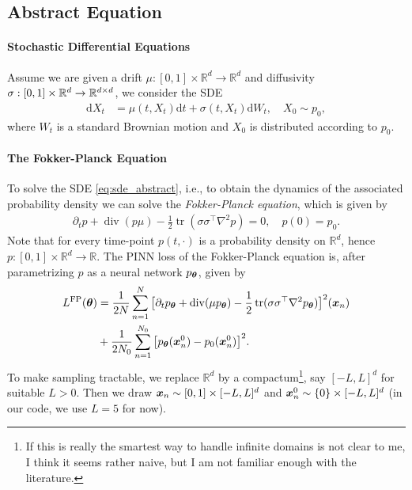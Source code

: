 \subsection{Abstract Equation}
\paragraph{Stochastic Differential Equations}
Assume we are given a drift $\mu:[0,1]\times \mathbb R^d\to\mathbb R^d$ and diffusivity $\sigma:[0,1] \times {\mathbb{R}}^d \to \mathbb R^{d\times d}$, we consider the SDE
\begin{align}\label{eq:sde_abstract}
  \mathrm dX_t
  &=
    \mu(t, X_t)\mathrm d t
    +
    \sigma(t, X_t) \mathrm d W_t,
    \quad
    X_0 \sim p_0,
\end{align}
where $W_t$ is a standard Brownian motion and $X_0$ is distributed according to $p_0$.

\paragraph{The Fokker-Planck Equation}
To solve the SDE \eqref{eq:sde_abstract}, i.e., to obtain the dynamics of the associated probability density we can solve the \emph{Fokker-Planck equation}, which is given by
\begin{align}\label{eq:fokker_planck_abstract}
  \partial_t p
  +
  \operatorname{div}(p\mu)
  -
  \frac12 \operatorname{tr}(\sigma \sigma^\top\nabla^2 p)
  =
  0,
  \quad
  p(0) = p_0.
\end{align}
Note that for every time-point $p(t,\cdot)$ is a probability density on $\mathbb R^d$, hence $p:[0,1]\times\mathbb R^d \to \mathbb R$. The PINN loss of the Fokker-Planck equation is, after parametrizing $p$ as a neural network $p_{{\bm{\theta}}}$, given by
\begin{align*}
  L^{\textrm{FP}}({\bm{\theta}})
  &=
    \frac{1}{2N}
    \sum_{n=1}^{N}
    \big[
    \partial_t p_{{\bm{\theta}}}
    +
    \operatorname{div}(\mu p_{{\bm{\theta}}})
    -
    \frac12 \operatorname{tr}(\sigma\sigma^\top\nabla^2 p_{{\bm{\theta}}})
    \big]^2
    ({\bm{x}}_n)
  \\
  &+
    \frac{1}{2 N_0}
    \sum_{n=1}^{N_0}
    \big[
    p_{{\bm{\theta}}}({\bm{x}}_n^0) - p_0({\bm{x}}_n^0)
    \big]^2.
\end{align*}
To make sampling tractable, we replace $\mathbb R^d$ by a compactum\footnote{If this is really the smartest way to handle infinite domains is not clear to me, I think it seems rather naive, but I am not familiar enough with the literature.}, say $[-L, L]^d$ for suitable $L>0$. Then we draw ${\bm{x}}_n \sim [0, 1] \times [-L, L]^d$ and ${\bm{x}}_n^0 \sim \{0\} \times [-L, L]^d$ (in our code, we use $L=5$ for now).

